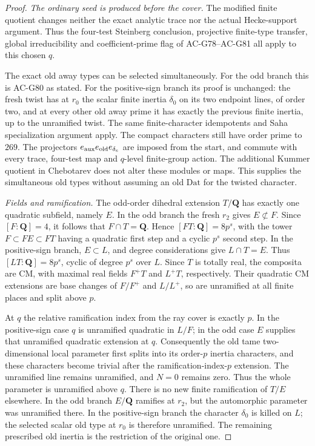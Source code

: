 \begin{proof}
\emph{The ordinary seed is produced before the cover.}
The modified finite quotient changes neither the exact
analytic trace nor the actual Hecke-support argument.
Thus the four-test Steinberg conclusion, projective
finite-type transfer, global irreducibility and
coefficient-prime flag of AC-G78--AC-G81 all apply to
this chosen \(q\).

The exact old away types can be selected simultaneously.
For the odd branch this is AC-G80 as stated.
For the positive-sign branch its proof is unchanged:
the fresh twist has at \(r_0\) the scalar finite inertia
\(\delta_0\) on its two endpoint lines, of order two,
and at every other old away prime it has exactly the
previous finite inertia, up to the unramified twist.
The same finite-character idempotents and Saha
specialization argument apply.
The compact characters still have order prime to \(269\).
The projectors \(e_{\rm aux}e_{\rm old}e_{\delta_e}\)
are imposed from the start, and commute with every
trace, four-test map and \(q\)-level finite-group action.
The additional Kummer quotient in Chebotarev does not
alter these modules or maps.
This supplies the simultaneous old types without
assuming an old \(\mathrm{Dat}\) for the twisted character.

\emph{Fields and ramification.}
The odd-order dihedral extension \(T/\mathbf Q\) has
exactly one quadratic subfield, namely \(E\).
In the odd branch the fresh \(r_2\) gives \(E\not\subset F\).
Since \([F:\mathbf Q]=4\), it follows that \(F\cap T=\mathbf Q\).
Hence \([FT:\mathbf Q]=8p^s\), with the tower
\(F\subset FE\subset FT\) having a quadratic first step
and a cyclic \(p^s\) second step.
In the positive-sign branch, \(E\subset L\), and degree
considerations give \(L\cap T=E\).
Thus \([LT:\mathbf Q]=8p^s\), cyclic of degree \(p^s\)
over \(L\).
Since \(T\) is totally real, the composita are CM, with
maximal real fields \(F^+T\) and \(L^+T\), respectively.
Their quadratic CM extensions are base changes of
\(F/F^+\) and \(L/L^+\), so are unramified at all finite
places and split above \(p\).

At \(q\) the relative ramification index from the ray
cover is exactly \(p\).
In the positive-sign case \(q\) is unramified quadratic
in \(L/F\); in the odd case \(E\) supplies that unramified
quadratic extension at \(q\).
Consequently the old tame two-dimensional local
parameter first splits into its order-\(p\) inertia
characters, and these characters become trivial after
the ramification-index-\(p\) extension.
The unramified line remains unramified, and \(N=0\)
remains zero.  Thus the whole parameter is unramified
above \(q\).
There is no new finite ramification of \(T/E\) elsewhere.
In the odd branch \(E/\mathbf Q\) ramifies at \(r_2\),
but the automorphic parameter was unramified there.
In the positive-sign branch the character \(\delta_0\)
is killed on \(L\); the selected scalar old type at
\(r_0\) is therefore unramified.
The remaining prescribed old inertia is the restriction
of the original one.


\end{proof}
